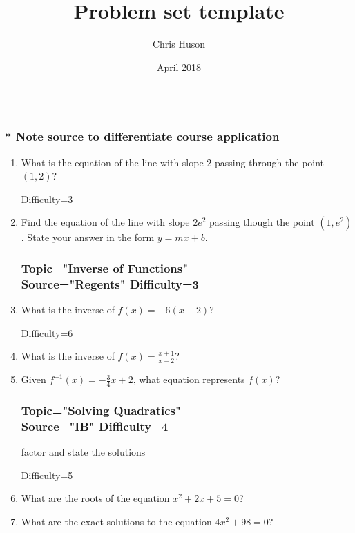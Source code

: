 \documentclass[12pt, oneside]{article}
\title{Problem set template}
\author{Chris Huson}
\date{April 2018}
\begin{document}
\subsubsection*{\\* \textnormal{Note source to differentiate course application}}

\begin{enumerate}
\subsubsection*{Topic="Writing Linear Equations"\\
Source="cjh" 
Difficulty=2}

\item What is the equation of the line with slope 2 passing through the point $(1, 2)$?

Difficulty=3
\item Find the equation of the line with slope $2e^2$ passing though the point $(1, e^2)$. State your answer in the form $y=mx+b$.

\subsubsection*{Topic="Inverse of Functions"\\
Source="Regents" 
Difficulty=3}

\item What is the inverse of $f(x)=-6(x-2)$? %

Difficulty=6
\item What is the inverse of $\displaystyle f(x)=\frac{x+1}{x-2}$? %

\item Given $f^{-1}(x)=-\frac{3}{4}x+2$, what equation represents $f(x)$? %

\subsubsection*{Topic="Solving Quadratics"\\
Source="IB" 
Difficulty=4}
factor and state the solutions

Difficulty=5
\item What are the roots of the equation $x^2+ 2x+5 =0$? %

\item What are the exact solutions to the equation $4x^2+98=0$? %


\end{enumerate}
\end{document}
